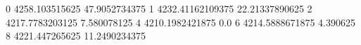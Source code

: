 0 4258.103515625 47.9052734375
1 4232.41162109375 22.21337890625
2 4217.7783203125 7.580078125
4 4210.1982421875 0.0
6 4214.5888671875 4.390625
8 4221.447265625 11.2490234375
